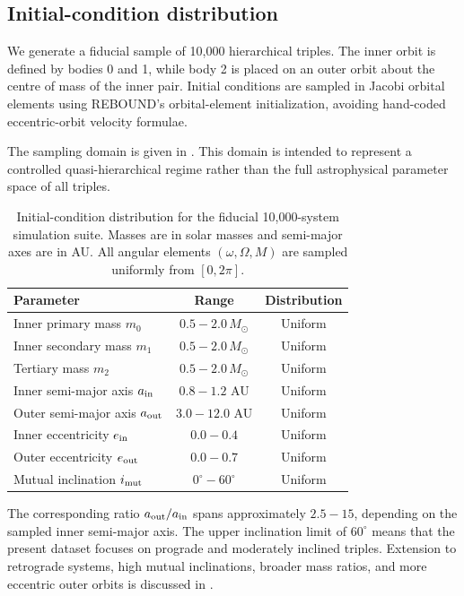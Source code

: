 \documentclass[12pt,a4paper]{article}
\newcommand{\Msun}{M_\odot}
\begin{document}
\subsection{Initial-condition distribution}
\label{sec:ic_distribution}

We generate a fiducial sample of 10,000 hierarchical triples. The inner orbit is defined by bodies 0 and 1, while body 2 is placed on an outer orbit about the centre of mass of the inner pair. Initial conditions are sampled in Jacobi orbital elements using REBOUND's orbital-element initialization, avoiding hand-coded eccentric-orbit velocity formulae.

The sampling domain is given in . This domain is intended to represent a controlled quasi-hierarchical regime rather than the full astrophysical parameter space of all triples.

\begin{table}[H]
\centering
\caption{Initial-condition distribution for the fiducial 10,000-system simulation suite. Masses are in solar masses and semi-major axes are in AU. All angular elements \((\omega,\Omega,M)\) are sampled uniformly from \([0,2\pi]\).}
\label{tab:parameter_space}
\begin{tabular}{lcc}
\toprule
Parameter & Range & Distribution \\
\midrule
Inner primary mass \(m_0\) & \(0.5-2.0\,\Msun\) & Uniform \\
Inner secondary mass \(m_1\) & \(0.5-2.0\,\Msun\) & Uniform \\
Tertiary mass \(m_2\) & \(0.5-2.0\,\Msun\) & Uniform \\
Inner semi-major axis \(a_{\rm in}\) & \(0.8-1.2\) AU & Uniform \\
Outer semi-major axis \(a_{\rm out}\) & \(3.0-12.0\) AU & Uniform \\
Inner eccentricity \(e_{\rm in}\) & \(0.0-0.4\) & Uniform \\
Outer eccentricity \(e_{\rm out}\) & \(0.0-0.7\) & Uniform \\
Mutual inclination \(i_{\rm mut}\) & \(0^\circ-60^\circ\) & Uniform \\
\bottomrule
\end{tabular}
\end{table}

The corresponding ratio \(a_{\rm out}/a_{\rm in}\) spans approximately \(2.5-15\), depending on the sampled inner semi-major axis. The upper inclination limit of \(60^\circ\) means that the present dataset focuses on prograde and moderately inclined triples. Extension to retrograde systems, high mutual inclinations, broader mass ratios, and more eccentric outer orbits is discussed in .
\end{document}
